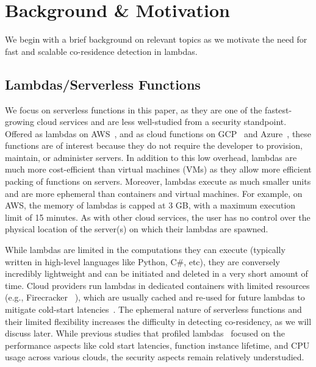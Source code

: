 \section{Background \& Motivation}
\label{sec:background}

We begin with a brief background on relevant topics as we motivate the need for
fast and scalable co-residence detection in lambdas.

\subsection{Lambdas/Serverless Functions} 
\label{sec:background:lambdas}

We focus on serverless functions in this paper, as they are one of the
fastest-growing cloud services and are less well-studied from a security
standpoint. Offered as lambdas on AWS~\cite{awslambda}, and as cloud functions
on GCP~\cite{gcpfunctions} and Azure~\cite{azurefunctions}, these functions are
of interest because they do not require the developer to provision, maintain, or
administer servers. In addition to this low overhead, lambdas are much more
cost-efficient than virtual machines (VMs) as they allow more efficient packing
of functions on servers. Moreover, lambdas execute as much smaller units  and
are more ephemeral than containers and virtual machines.  For example, on AWS,
the memory of lambdas is capped at 3 GB, with a maximum execution limit of 15
minutes.  As with other cloud services, the user has no control over the
physical location of the server(s) on which their lambdas are spawned.

While lambdas are limited in the computations they can execute (typically
written in high-level languages like Python, C\#, etc), they are conversely
incredibly lightweight and can be initiated and deleted in a very short amount
of time. Cloud providers run lambdas in dedicated containers with limited
resources (e.g., Firecracker ~\cite{firecracker}), which are usually cached and
re-used for future lambdas to mitigate cold-start
latencies~\cite{awscontainerreuse}. The ephemeral nature of serverless functions
and their limited flexibility increases the difficulty in detecting
co-residency, as we will discuss later. While previous studies that profiled
lambdas~\cite{wangusenix2018} focused on the performance aspects like cold start
latencies, function instance lifetime, and CPU usage across various clouds,
the security aspects remain relatively understudied.


